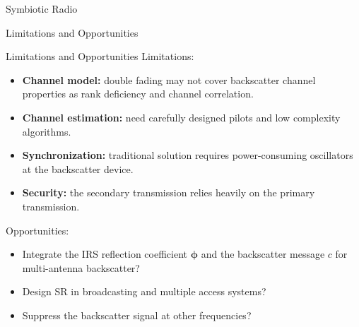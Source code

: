 \documentclass[9pt]{beamer}
\begin{document}
\begin{section}{Symbiotic Radio}
		\begin{subsection}{Limitations and Opportunities}
			\begin{frame}{Limitations and Opportunities}
				Limitations:
				\begin{itemize}
					\item \textbf{Channel model:} double fading may not cover backscatter channel properties as rank deficiency and channel correlation.
					\item \textbf{Channel estimation:} need carefully designed pilots and low complexity algorithms.
					\item \textbf{Synchronization:} traditional solution requires power-consuming oscillators at the backscatter device.
					\item \textbf{Security:} the secondary transmission relies heavily on the primary transmission.
				\end{itemize}

				\vspace{1em}

				Opportunities:
				\begin{itemize}
					\item Integrate the IRS reflection coefficient $\boldsymbol{\phi}$ and the backscatter message $c$ for multi-antenna backscatter?
					\item Design SR in broadcasting and multiple access systems?
					\item Suppress the backscatter signal at other frequencies?
				\end{itemize}
			\end{frame}
		\end{subsection}
	\end{section}

	
	
\end{document}
